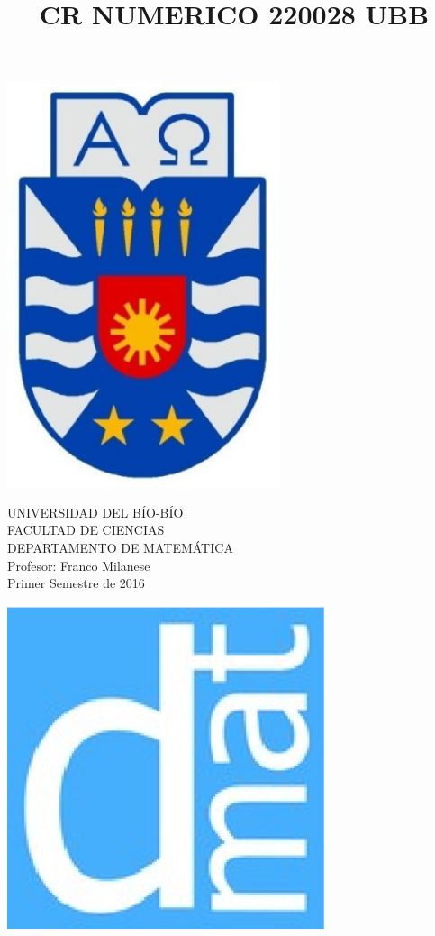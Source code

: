 \documentclass[11pt]{article}
\begin{document}
\title{CR NUMERICO 220028 UBB}

{\begin{minipage}{2cm}
\hspace*{1cm}\includegraphics[width=0.6\textwidth]{escubo-ubb.eps}
\end{minipage}
\begin{minipage}{12cm}
\small
{\bf \rm 
{
\begin{center}
{\footnotesize UNIVERSIDAD DEL B\'IO-B\'IO} \\
{\scriptsize FACULTAD DE CIENCIAS}  \\
{\scriptsize DEPARTAMENTO DE MATEM\'ATICA}  \\
{\scriptsize Profesor:  Franco Milanese}\\
{\scriptsize Primer Semestre de 2016}
\end{center}
}}
\end{minipage}}
{\begin{minipage}{2cm}
\hspace*{-0.5cm}\vspace*{-0.05cm}\includegraphics[width=0.7\textwidth]{escudo-dmat.eps}
\end{minipage}}
\end{document}

